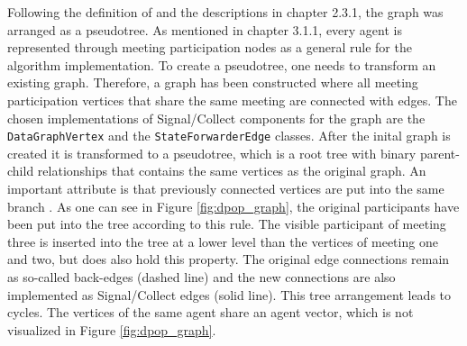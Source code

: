Following the definition of \cite{Petcu2003} and the descriptions in chapter 2.3.1, the graph was arranged as a pseudotree. As mentioned in chapter 3.1.1, every agent is represented through meeting participation nodes as a general rule for the algorithm implementation. To create a pseudotree, one needs to transform an existing graph. Therefore, a graph has been constructed where all meeting participation vertices that share the same meeting are connected with edges. The chosen implementations of Signal/Collect components for the graph are the \texttt{DataGraphVertex} and the \texttt{StateForwarderEdge} classes. After the inital graph is created it is transformed to a pseudotree, which is a root tree with binary parent-child relationships that contains the same vertices as the original graph. An important attribute is that previously connected vertices are put into the same branch \cite{Petcu2003}. As one can see in Figure \ref{fig:dpop_graph}, the original participants have been put into the tree according to this rule. The visible participant of meeting three is inserted into the tree at a lower level than the vertices of meeting one and two, but does also hold this property. The original edge connections remain as so-called back-edges (dashed line) and the new connections are also implemented as Signal/Collect edges (solid line). This tree arrangement leads to cycles. The vertices of the same agent share an agent vector, which is not visualized in Figure \ref{fig:dpop_graph}.

